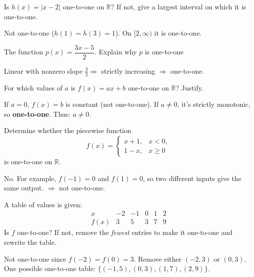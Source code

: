 \documentclass[12pt,fleqn]{book}
\newcommand{\prb}[1]{\begin{Exercise}#1\end{Exercise}}
\newcommand{\sol}[1]{\begin{Answer}#1\end{Answer}}
\begin{document}
\prb{Is \(h(x)=|x-2|\) one-to-one on \(\mathbb{R}\)? If not, give a largest interval on which it is one-to-one.
    \\[1in]
}
\sol{Not one-to-one (\(h(1)=h(3)=1\)). On \([2,\infty)\) it is one-to-one.}

        \prb{The function \(p(x)=\dfrac{3x-5}{2}\). Explain why \(p\) is one-to-one}
        \sol{Linear with nonzero slope \(\tfrac{3}{2}\Rightarrow\) strictly increasing \(\Rightarrow\) one-to-one.}

        \prb{For which values of \(a\) is \(f(x)=ax+b\) one-to-one on \(\mathbb{R}\)? Justify.
            \\[1in]
        }
        \sol{If \(a=0\), \(f(x)=b\) is constant (not one-to-one). If \(a\ne0\), it’s strictly monotonic, so \textbf{one-to-one}. Thus: \(a\ne0\).}

        \prb{Determine whether the piecewise function
            \[
                f(x)=\begin{cases}
                    x+1, & x<0,  \\
                    1-x, & x\ge0
                \end{cases}
            \]
            is one-to-one on \(\mathbb{R}\).
            \\[1in]
        }
        \sol{No. For example, \(f(-1)=0\) and \(f(1)=0\), so two different inputs give the same output. \(\Rightarrow\) not one-to-one.}

        \prb{A table of values is given:
            \[
                \begin{array}{c|ccccc}
                    x    & -2 & -1 & 0 & 1 & 2 \\\hline
                    f(x) & 3  & 5  & 3 & 7 & 9
                \end{array}
            \]
            Is \(f\) one-to-one? If not, remove the \emph{fewest} entries to make it one-to-one and rewrite the table.
            \\[1in]}
        \sol{Not one-to-one since \(f(-2)=f(0)=3\). Remove either \((-2,3)\) or \((0,3)\). One possible one-to-one table:
            \(\{(-1,5),(0,3),(1,7),(2,9)\}\).}
\end{document}
